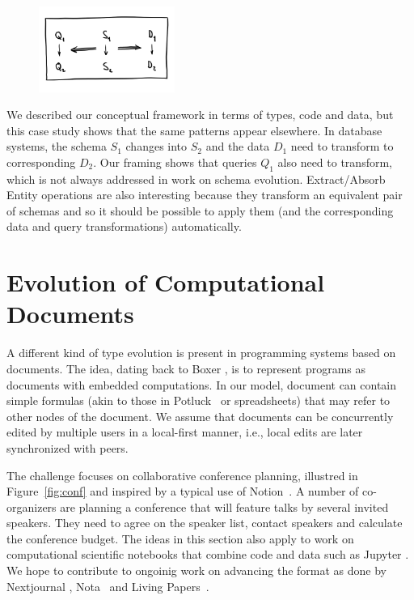 \documentclass[english,submission]{programming}
\DeclareRobustCommand{\frameworkbox}[2][gray!15]{
\begin{tcolorbox}[breakable,left=3pt,right=3pt,top=3pt,bottom=3pt,colback=#1,colframe=#1,parbox=false,
  width=\dimexpr\textwidth\relax,enlarge left by=0mm,boxsep=5pt,arc=0pt,enlarge top by=0.5em,%
  outer arc=0pt]\setlength{\parskip}{0.5em}#2
\end{tcolorbox}}
\newcommand{\frameworkboxtitle}[1]{\setlength{\parindent}{0em}{\firamedium #1.}\quad}
\begin{document}
\frameworkbox{
\begin{figure}
\vspace{-0.5em}
\includegraphics[width=12em]{figures/arr-db.png}
\vspace{-1em}
\end{figure}
\frameworkboxtitle{Equivalence in Schema Evolution}
We described our conceptual framework in terms of types, code and data, but this case
study shows that the same patterns appear elsewhere. In database systems, the schema
$S_1$ changes into $S_2$ and the data $D_1$ need to transform to corresponding $D_2$.
Our framing shows that queries $Q_1$ also need to transform, which is not always addressed
in work on schema evolution. Extract/Absorb Entity operations are also interesting because
they transform an equivalent pair of schemas and so it should be possible to apply them
(and the corresponding data and query transformations) automatically.
}


\section{Evolution of Computational Documents}
A different kind of type evolution is present in programming systems based on documents.
The idea, dating back to Boxer \cite{diSessa86}, is to represent programs as documents
with embedded computations. In our model, document can contain simple formulas (akin to those
in Potluck~\cite{Litt2023} or spreadsheets) that may refer to other nodes of the document.
We assume that documents can be concurrently edited by multiple users in a local-first manner,
i.e., local edits are later synchronized with peers.

The challenge focuses on collaborative conference planning, illustred in Figure~\ref{fig:conf}
and inspired by a typical use of Notion~\cite{notion}. A number of co-organizers are planning
a conference that will feature talks by several invited speakers. They need to agree on the
speaker list, contact speakers and calculate the conference budget.
%
The ideas in this section also apply to work on computational scientific notebooks
that combine code and data such as Jupyter \cite{Kluyver2016}. We hope to contribute to ongoinig
work on advancing the format as done by Nextjournal \cite{Nextjournal21}, Nota~\cite{Crichton2021}
and Living Papers~\cite{Heer2023}.
\end{document}
